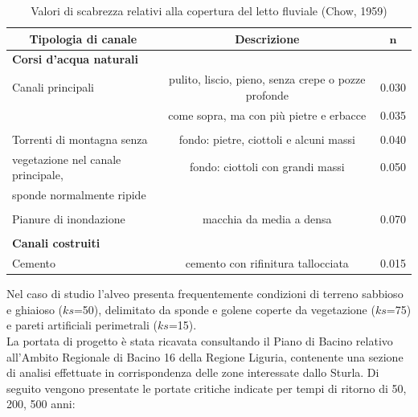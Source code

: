 \documentclass[12pt]{article} %
\begin{document}
\begin{table}[H]
    \centering
    \begin{tabular}{lcc}
        \hline
        \multicolumn{1}{c}{\textbf{Tipologia di canale}} & \textbf{Descrizione} & $\mathbf{n}$  \\
        \hline
        \textbf{Corsi d'acqua naturali} & &\\
        \hspace{1.5pt} Canali principali & pulito, liscio, pieno, senza crepe o pozze profonde & 0.030\\
        & come sopra, ma con più pietre e erbacce &  0.035\\
        [-1em]\\
        \hspace{1.5pt} Torrenti di montagna senza & fondo: pietre, ciottoli e alcuni massi & 0.040\\
        \hspace{1.5pt} vegetazione nel canale principale, & fondo: ciottoli con grandi massi & 0.050\\
        \hspace{1.5pt} sponde normalmente ripide & &\\
        [-1em]\\
        \hspace{1.5pt} Pianure di inondazione & macchia da media a densa & 0.070\\
        [-1em]\\
        \textbf{Canali costruiti} & &\\
        \hspace{1.5pt} Cemento & cemento con rifinitura tallocciata & 0.015\\
        \hline
    \end{tabular}
    \caption{Valori di scabrezza relativi alla copertura del letto fluviale (Chow, 1959)}
    \label{tab:Manning_alvei}
\end{table}

\noindent Nel caso di studio l'alveo presenta frequentemente condizioni di terreno sabbioso e ghiaioso ($ks$=50), delimitato da sponde e golene coperte da vegetazione ($ks$=75) e pareti artificiali perimetrali ($ks$=15).\\
La portata di progetto è stata ricavata consultando il Piano di Bacino relativo all'Ambito Regionale di Bacino 16 della Regione Liguria, contenente una sezione di analisi effettuate in corrispondenza delle zone interessate dallo Sturla. Di seguito vengono presentate le portate critiche indicate per tempi di ritorno di 50, 200, 500 anni:
\end{document}
